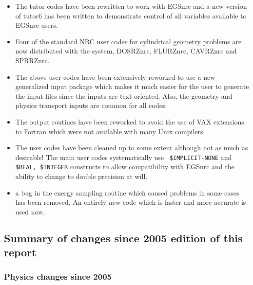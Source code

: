 \begin{itemize}
\item The tutor codes have been rewritten to work with EGSnrc and a new
version of tutor6 has been written to demonstrate control of all variables
available to EGSnrc users.

\item Four of the standard NRC user codes for cylindrical geometry problems
 are now distributed with the system, DOSRZnrc, FLURZnrc, CAVRZnrc and
SPRRZnrc.

\item The above user codes have been extensively reworked to use a
new generalized input package which makes it much easier for the user
to generate the input files since the inputs are text oriented. Also,
the geometry and physics transport inputs are common for all codes.

\item The output routines have been reworked to avoid the use of
VAX extensions to Fortran which were not available with many Unix compilers.

\item The user codes have been cleaned up to some extent although not as
much as desirable! The main user codes systematically use {\tt
\$IMPLICIT-NONE}
and {\tt \$REAL, \$INTEGER} constructs to allow compatibility with EGSnrc and
the ability to change to double precision at will.

\item a bug in the energy sampling routine which caused problems in some
cases has been removed. An entirely new code which is faster and more
accurate is used now.
\end{itemize}

\subsection{Summary of changes since 2005 edition of this report}

\subsubsection{Physics changes since 2005}

